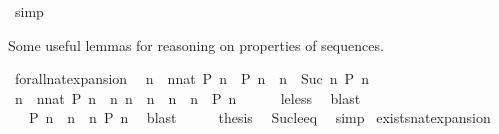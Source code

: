 \begin{isabellebody}
\ simp\isanewline
{}\isamarkupfalse%
%
\endisatagproof
{\isafoldproof}%
%
\isadelimproof
%
\endisadelimproof
%
\begin{isamarkuptext}%
Some useful lemmas for reasoning on properties of sequences.%
\end{isamarkuptext}\isamarkuptrue%
\isamarkupfalse%
\ forall{\isacharunderscore}nat{\isacharunderscore}expansion{\isacharcolon}\isanewline
\ \ {\isacartoucheopen}{\isacharparenleft}{\isasymforall}n\ {\isasymge}\ {\isacharparenleft}nnat{\isacharparenright}{\isachardot}\ P\ n{\isacharparenright}\ {\isacharequal}\ {\isacharparenleft}P\ n\ {\isasymand}\ {\isacharparenleft}{\isasymforall}n\ {\isasymge}\ Suc\ n\ P\ n{\isacharparenright}{\isacharparenright}{\isacartoucheclose}\isanewline
%
\isadelimproof
%
\endisadelimproof
%
\isatagproof
{}\isamarkupfalse%
\ {\isacharminus}\isanewline
\ \ \isamarkupfalse%
\ {\isacartoucheopen}{\isacharparenleft}{\isasymforall}n\ {\isasymge}\ {\isacharparenleft}nnat{\isacharparenright}{\isachardot}\ P\ n{\isacharparenright}\ {\isacharequal}\ {\isacharparenleft}{\isasymforall}n{\isachardot}\ {\isacharparenleft}n\ {\isacharequal}\ n\ {\isasymor}\ n\ {\isachargreater}\ n\ {\isasymlongrightarrow}\ P\ n{\isacharparenright}{\isacartoucheclose}\isanewline
\ \ \ \ \isamarkupfalse%
\ le{\isacharunderscore}less\ \isamarkupfalse%
\ blast\isanewline
\ \ \isamarkupfalse%
\ \isamarkupfalse%
\ {\isacartoucheopen}{\isachardot}{\isachardot}{\isachardot}\ {\isacharequal}\ {\isacharparenleft}P\ n\ {\isasymand}\ {\isacharparenleft}{\isasymforall}n\ {\isachargreater}\ n\ P\ n{\isacharparenright}{\isacharparenright}{\isacartoucheclose}\ \isamarkupfalse%
\ blast\isanewline
\ \ \isamarkupfalse%
\ \isamarkupfalse%
\ {\isacharquery}thesis\ \isamarkupfalse%
\ Suc{\isacharunderscore}le{\isacharunderscore}eq\ \isamarkupfalse%
\ simp\isanewline
{}\isamarkupfalse%
%
\endisatagproof
{\isafoldproof}%
%
\isadelimproof
\isanewline
%
\endisadelimproof
\isanewline
{}\isamarkupfalse%
\ exists{\isacharunderscore}nat{\isacharunderscore}expansion{\isacharcolon}\isanewline

\end{isabellebody}
